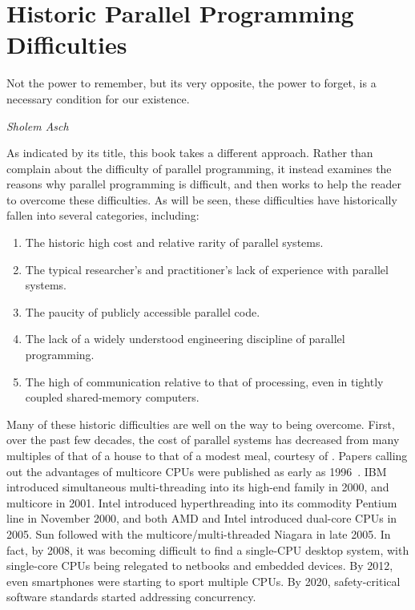 \section{Historic Parallel Programming Difficulties}
\label{sec:intro:Historic Parallel Programming Difficulties}
%
\epigraph{Not the power to remember, but its very opposite, the power to
	  forget, is a necessary condition for our existence.}
	 {\emph{Sholem Asch}}

As indicated by its title, this book takes a different approach.
Rather than complain about the difficulty of parallel programming,
it instead examines the reasons why parallel programming is
difficult, and then works to help the reader to overcome these
difficulties.
As will be seen, these difficulties have historically fallen into several
categories, including:

\begin{enumerate}
\item	The historic high cost and relative rarity of parallel systems.
\item	The typical researcher's and practitioner's lack of experience
	with parallel systems.
\item	The paucity of publicly accessible parallel code.
\item	The lack of a widely understood engineering discipline of
	parallel programming.
\item	The high  of communication relative to that of processing,
	even in tightly coupled shared-memory computers.
\end{enumerate}

Many of these historic difficulties are well on the way to being overcome.
First, over the past few decades, the cost of parallel systems
has decreased from many multiples of that of a house to that of a
modest meal, courtesy of .
Papers calling out the advantages of multicore CPUs were published
as early as 1996~\cite{Olukotun96}.
IBM introduced simultaneous multi-threading
into its high-end \Power{} family in 2000, and multicore in 2001.
Intel introduced hyperthreading into its commodity Pentium line in
November 2000, and both AMD and Intel introduced
dual-core CPUs in 2005.
Sun followed with the multicore/multi-threaded Niagara in late 2005.
In fact, by 2008, it was becoming difficult
to find a single-CPU desktop system, with single-core CPUs being
relegated to netbooks and embedded devices.
By 2012, even smartphones were starting to sport multiple CPUs.
By 2020, safety-critical software standards started addressing
concurrency.

